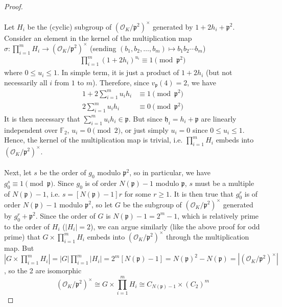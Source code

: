 \documentclass{treatise}
\begin{document}
\begin{shaded}
\begin{proof}
\\
\\
Let $H_i$ be the (cyclic) subgroup of $(\mathcal{O}_K / \mathfrak{p}^2)^\times$ generated by $1 + 2h_i + \mathfrak{p}^2$. Consider an element in the kernel of the multiplication map $\sigma: \prod_{i = 1}^m H_i \to (\mathcal{O}_K / \mathfrak{p}^2)^\times$ (sending $(b_1, b_2, \hdots, b_m) \mapsto b_1 b_2 \cdots b_m$)
\begin{align*}
\prod_{i = 1}^m (1 + 2h_i)^{u_i} \equiv 1 \pmod{\mathfrak{p}^2}
\end{align*}
where $0 \leq u_i \leq 1$. In simple term, it is just a product of $1 + 2h_i$ (but not necessarily all $i$ from $1$ to $m$). Therefore, since $v_\mathfrak{p} (4) = 2$, we have
\begin{align*}
1 + 2 \sum_{i = 1}^m u_i h_i & \equiv 1 \pmod{\mathfrak{p}^2} \\
2 \sum_{i = 1}^m u_i h_i & \equiv 0 \pmod{\mathfrak{p}^2}
\end{align*}
It is then necessary that $\sum_{i = 1}^m u_i h_i \in \mathfrak{p}$. But since $\mathfrak{h}_i = h_i + \mathfrak{p}$ are linearly independent over $\mathbb{F}_2$, $u_i = 0 \pmod{2}$, or just simply $u_i = 0$ since $0 \leq u_i \leq 1$. Hence, the kernel of the multiplication map is trivial, i.e. $\prod_{i = 1}^m H_i$ embeds into $(\mathcal{O}_K / \mathfrak{p}^2)^\times$.
\\
\\
Next, let $s$ be the order of $g_0$ modulo $\mathfrak{p}^2$, so in particular, we have $g_0^s \equiv 1 \pmod{\mathfrak{p}}$. Since $g_0$ is of order $N(\mathfrak{p}) - 1$ modulo $\mathfrak{p}$, $s$ must be a multiple of $N(\mathfrak{p}) - 1$, i.e. $s = [N(\mathfrak{p}) - 1] r$ for some $r \geq 1$. It is then true that $g_0^r$ is of order $N(\mathfrak{p}) - 1$ modulo $\mathfrak{p}^2$, so let $G$ be the subgroup of $(\mathcal{O}_K / \mathfrak{p}^2)^\times$ generated by $g_0^r + \mathfrak{p}^2$. Since the order of $G$ is $N(\mathfrak{p}) - 1 = 2^m - 1$, which is relatively prime to the order of $H_i$ ($|H_i| = 2$), we can argue similarly (like the above proof for odd prime) that $G \times \prod_{i = 1}^m H_i$ embeds into $(\mathcal{O}_K / \mathfrak{p}^2)^\times$ through the multiplication map. But $\left| G \times \prod_{i = 1}^m H_i \right| = |G| \prod_{i = 1}^m |H_i| = 2^m [N(\mathfrak{p}) - 1] = N(\mathfrak{p})^2 - N(\mathfrak{p}) = |(\mathcal{O}_K / \mathfrak{p}^2)^\times|$, so the 2 are isomorphic
$$(\mathcal{O}_K / \mathfrak{p}^2)^\times \cong G \times \prod_{i = 1}^m H_i \cong C_{N(\mathfrak{p}) - 1} \times (C_2)^m$$

\end{proof}
\end{shaded}
\end{document}
